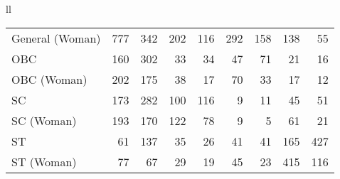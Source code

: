 \begin{table}
\begin{tabular}[t]{ll}
\begin{tabular}{lrrrrrrrr}
General (Woman) & 777 & 342 & 202 & 116 & 292 & 158 & 138 & 55\\
OBC & 160 & 302 & 33 & 34 & 47 & 71 & 21 & 16\\
OBC (Woman) & 202 & 175 & 38 & 17 & 70 & 33 & 17 & 12\\
SC & 173 & 282 & 100 & 116 & 9 & 11 & 45 & 51\\
\addlinespace
SC (Woman) & 193 & 170 & 122 & 78 & 9 & 5 & 61 & 21\\
ST & 61 & 137 & 35 & 26 & 41 & 41 & 165 & 427\\
ST (Woman) & 77 & 67 & 29 & 19 & 45 & 23 & 415 & 116\\
\bottomrule
\end{tabular}\\
\bottomrule
\end{tabular}
\end{table}